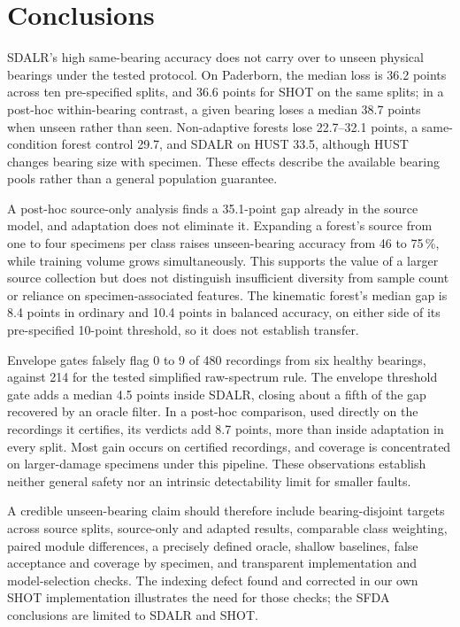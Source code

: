 \section{Conclusions}
\label{sec:conclusions}
SDALR's high same-bearing accuracy does not carry over to unseen physical bearings under the tested protocol. On Paderborn, the median loss is 36.2 points across ten pre-specified splits, and 36.6 points for SHOT on the same splits; in a post-hoc within-bearing contrast, a given bearing loses a median 38.7 points when unseen rather than seen. Non-adaptive forests lose 22.7--32.1 points, a same-condition forest control 29.7, and SDALR on HUST 33.5, although HUST changes bearing size with specimen. These effects describe the available bearing pools rather than a general population guarantee.

A post-hoc source-only analysis finds a 35.1-point gap already in the source model, and adaptation does not eliminate it. Expanding a forest's source from one to four specimens per class raises unseen-bearing accuracy from 46 to 75\,\%, while training volume grows simultaneously. This supports the value of a larger source collection but does not distinguish insufficient diversity from sample count or reliance on specimen-associated features. The kinematic forest's median gap is 8.4 points in ordinary and 10.4 points in balanced accuracy, on either side of its pre-specified 10-point threshold, so it does not establish transfer.

Envelope gates falsely flag 0 to 9 of 480 recordings from six healthy bearings, against 214 for the tested simplified raw-spectrum rule. The envelope threshold gate adds a median 4.5 points inside SDALR, closing about a fifth of the gap recovered by an oracle filter. In a post-hoc comparison, used directly on the recordings it certifies, its verdicts add 8.7 points, more than inside adaptation in every split. Most gain occurs on certified recordings, and coverage is concentrated on larger-damage specimens under this pipeline. These observations establish neither general safety nor an intrinsic detectability limit for smaller faults.

A credible unseen-bearing claim should therefore include bearing-disjoint targets across source splits, source-only and adapted results, comparable class weighting, paired module differences, a precisely defined oracle, shallow baselines, false acceptance and coverage by specimen, and transparent implementation and model-selection checks. The indexing defect found and corrected in our own SHOT implementation illustrates the need for those checks; the SFDA conclusions are limited to SDALR and SHOT.
